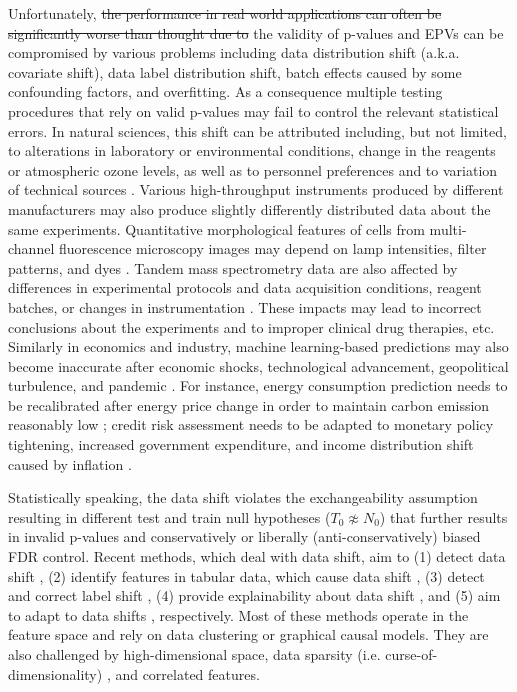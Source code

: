 \documentclass{article}
\newcommand{\correction}[2]{{\color{red}\sout{#1}}{\color{red}#2}}
\newcommand{\edit}[1]{{\color{red}#1}}
\begin{document}
Unfortunately, \correction{the  performance in real world applications can often be significantly worse than thought due to }{the validity of p-values and EPVs can be compromised by various problems including  } data distribution shift (a.k.a. covariate shift), data label distribution shift, batch effects \cite{Candela2009DatasetShift} caused by some confounding factors, and overfitting. \edit{As a consequence multiple testing procedures that rely on valid p-values may fail to control the relevant statistical errors.} In natural sciences, this shift can be attributed including, but not limited, to alterations in laboratory or environmental conditions, change in the reagents or atmospheric ozone levels, as well as to personnel preferences and to variation of technical sources \cite{leek2010tackling}. Various high-throughput instruments produced by different manufacturers may also produce slightly differently distributed data about the same experiments. Quantitative morphological features of cells from multi-channel fluorescence microscopy images may depend on lamp intensities, filter patterns, and dyes \cite{bray2016cell}. Tandem mass spectrometry data are also affected by differences in experimental protocols and data acquisition conditions, reagent batches, or changes in instrumentation \cite{phua2022perspectives, vcuklina2021diagnostics}. These impacts may lead to incorrect conclusions about the experiments and to improper clinical drug therapies, etc. Similarly in economics and industry, machine learning-based predictions may also become inaccurate after economic shocks, technological advancement, geopolitical turbulence, and pandemic \cite{ramey2016macroeconomic}. For instance, energy consumption prediction needs to be recalibrated after energy price change in order to maintain carbon emission reasonably low \cite{clement2023coping}; credit risk assessment needs to be adapted to monetary policy tightening, increased government expenditure, and income distribution shift caused by inflation \cite{kritzman2012regime,guo2023predict, Zhang:EECS-2021-262}.


\edit{Statistically speaking, the data shift violates the exchangeability assumption resulting in different test and train null hypotheses ($T_0 \not\approx N_0$) that further results in invalid p-values and} conservatively or liberally (anti-conservatively) biased FDR control. 
Recent methods, which deal with data shift, aim to (1) detect data shift  \cite{ dasu2009change}, (2) identify features in tabular data, which cause data shift \cite{kulinski2020feature}, (3) detect and correct label shift \cite{lipton2018detecting}, (4) provide explainability about data shift \cite{budhathoki2021did,kulinski2023towards}, and (5) aim to adapt to data shifts \cite{sui2024unleashing, zhang2021adaptive, zhang2022memo}, respectively. Most of these methods operate in the feature space and rely on data clustering or graphical causal models. They are also challenged by high-dimensional space, data sparsity (i.e. curse-of-dimensionality) \cite{donoho2000high}, and correlated features. 
\end{document}
